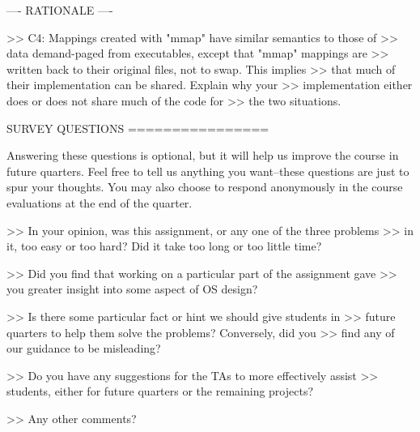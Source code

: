 ---- RATIONALE ----

>> C4: Mappings created with "mmap" have similar semantics to those of
>> data demand-paged from executables, except that "mmap" mappings are
>> written back to their original files, not to swap.  This implies
>> that much of their implementation can be shared.  Explain why your
>> implementation either does or does not share much of the code for
>> the two situations.

               SURVEY QUESTIONS
               ================

Answering these questions is optional, but it will help us improve the
course in future quarters.  Feel free to tell us anything you
want--these questions are just to spur your thoughts.  You may also
choose to respond anonymously in the course evaluations at the end of
the quarter.

>> In your opinion, was this assignment, or any one of the three problems
>> in it, too easy or too hard?  Did it take too long or too little time?

>> Did you find that working on a particular part of the assignment gave
>> you greater insight into some aspect of OS design?

>> Is there some particular fact or hint we should give students in
>> future quarters to help them solve the problems?  Conversely, did you
>> find any of our guidance to be misleading?

>> Do you have any suggestions for the TAs to more effectively assist
>> students, either for future quarters or the remaining projects?

>> Any other comments?
